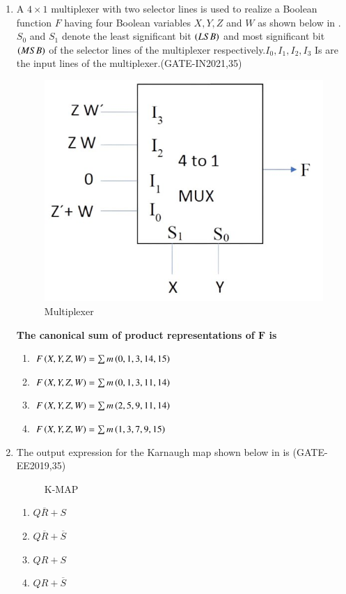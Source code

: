\begin{enumerate}[label=\arabic*.,ref=\theenumi]
\item A $ 4\times1$ multiplexer with two selector lines is used to realize a Boolean function $F$ having four Boolean variables $X, Y, Z$ and $W$ as shown below
in  .
	 $S_0$ and $S_1$ denote the least significant bit $\left(LSB\right)$ and most significant bit $\left(MSB\right)$ of the selector lines of the multiplexer respectively.$I_0, I_1, I_2,I_3$ Is are the input lines of the multiplexer.\hfill(GATE-IN2021,35)
  \begin{figure}[!ht]
  \centering
  \includegraphics[width=\columnwidth]{figs/kmapsmall.jpg}
  \caption{Multiplexer}
  \label{fig:multiplexerwithtwoselectionliness}
\end{figure}
\textbf{The canonical sum of product representations of $\textbf{F}$ is} 
 \begin{enumerate}
        \item  $F\left(X,Y,Z,W\right) = \sum m \left(0,1,3,14,15\right)$
        \item  $F\left(X,Y,Z,W\right) = \sum m \left(0,1,3,11,14\right)$
        \item  $F\left(X,Y,Z,W\right) = \sum m \left(2,5,9,11,14\right)$
        \item  $F\left(X,Y,Z,W\right) = \sum m \left(1,3,7,9,15\right)$
    \end{enumerate}

\item The output expression for the Karnaugh map shown below in
				is
                                \hfill(GATE-EE2019,35)
		\begin{figure}[!ht]
            \centering		
   		
      	\caption{K-MAP}
                                \label{fig:GATE-EE2019,35}
		\end{figure}
\begin{enumerate}
    \item $Q\overline{R} + S$
    \item $Q\overline{R} + \overline{S}$
    \item $QR + S$
    \item $QR + \overline{S}$
\end{enumerate}




\end{enumerate}
